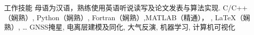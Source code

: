 
\begin{rubric}{工作技能}
\entry*[语言]
	母语为汉语，熟练使用英语听说读写及论文发表与算法实现.
	C/C++（娴熟）, Python（娴熟）, Fortran（娴熟）,MATLAB（精通）， , \LaTeX（娴熟）, \ldots
{}
	GNSS掩星, 电离层建模及同化, 大气反演, 机器学习, 计算机可视化
\end{rubric}
